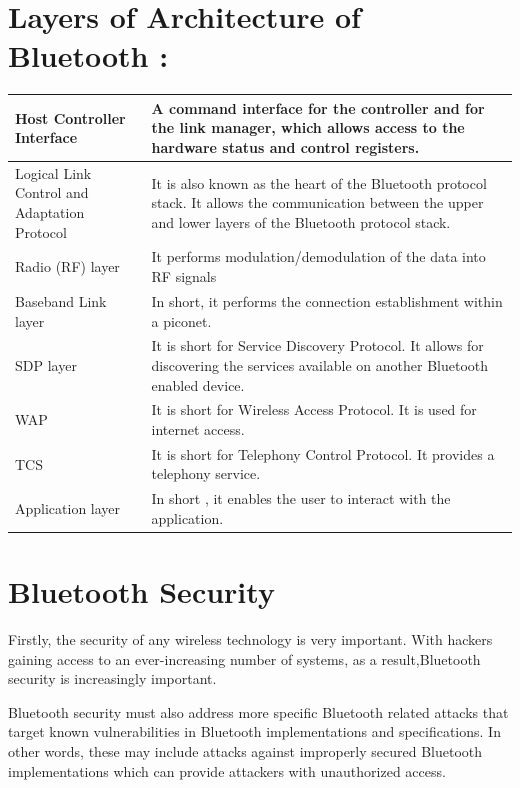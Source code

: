 \documentclass{report}
\begin{document}
\begin{multicols}{1}
\section*{Layers of Architecture of Bluetooth :} 
    \begin{center}
    \begin{tabular}{ | m{6em} | m{5cm} | } 
    \hline
    \textbf Host Controller Interface & A command interface for the controller and for the link manager, which allows access to the hardware status and control registers.\\ 
    \hline
    Logical Link Control and Adaptation Protocol & It is also known as the heart of the Bluetooth protocol stack. It allows the communication between the upper and lower layers of the Bluetooth protocol stack. \\ 
    \hline
    Radio (RF) layer & It performs modulation/demodulation of the data into RF signals\\ 
    \hline
    Baseband Link layer & In short, it performs the connection establishment within a piconet.\\
    \hline
    SDP layer & It is short for Service Discovery Protocol. It allows for discovering the services available on another Bluetooth enabled device.\\
    \hline
    WAP & It is short for Wireless Access Protocol. It is used for internet access.\\
    \hline
    TCS & It is short for Telephony Control Protocol. It provides a telephony service.\\
    \hline
    Application layer & 	In short , it enables the user to interact with the application.\\
    \hline

    \end{tabular}
    \end{center}

    \section*{Bluetooth Security } 
    
        
    Firstly, the security of any wireless technology is very important. With hackers gaining access to an ever-increasing number of systems, as a result,Bluetooth security is increasingly important.

    Bluetooth security must also address more specific Bluetooth related attacks that target known vulnerabilities in Bluetooth implementations and specifications. In other words, these may include attacks against improperly secured Bluetooth implementations which can provide attackers with unauthorized access.
 

\end{multicols}
\end{document}
